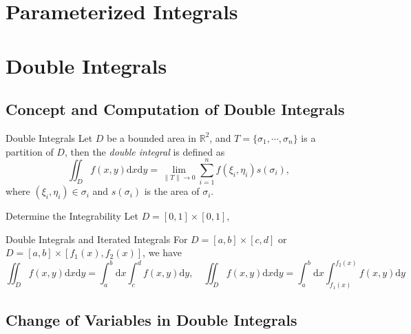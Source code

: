 
\section{Parameterized Integrals}


\section{Double Integrals}

\subsection{Concept and Computation of Double Integrals}

\begin{definition}{Double Integrals}{}
  Let $D$ be a bounded area in $\mathbb{R}^2$,
  and $T = \{\sigma_1,\cdots,\sigma_n\}$ is a partition of $D$,
  then the \emph{double integral} is defined as
  \begin{equation}
    \iint_D f(x,y)\mathrm{d}x \mathrm{d}y = \lim \limits _{\|T\|\rightarrow 0} \sum\limits_{i = 1}^n f(\xi_i, \eta_i) s(\sigma_i),
  \end{equation}
  where $(\xi_i, \eta_i) \in \sigma_i$ and $s(\sigma_i)$ is the area of $\sigma_i$.
\end{definition}

\begin{example}{Determine the Integrability}{}
  Let $D = [0, 1]\times [0,1]$, 
\end{example}

\begin{proposition}{Double Integrals and Iterated Integrals}{}
  For $D = [a, b] \times [c, d]$ or $D = [a, b] \times [f_1(x), f_2(x)]$,
  we have
  \begin{equation}
    \iint_Df(x,y)\mathrm{d}x\mathrm{d}y=\int_a^b\mathrm{d}x\int_c^df(x,y)\mathrm{d}y,\quad
    \iint_Df(x,y)\mathrm{d}x\mathrm{d}y=\int_a^b\mathrm{d}x\int_{f_1(x)}^{f_2(x)}f(x,y)\mathrm{d}y
  \end{equation}
\end{proposition}

\subsection{Change of Variables in Double Integrals}

